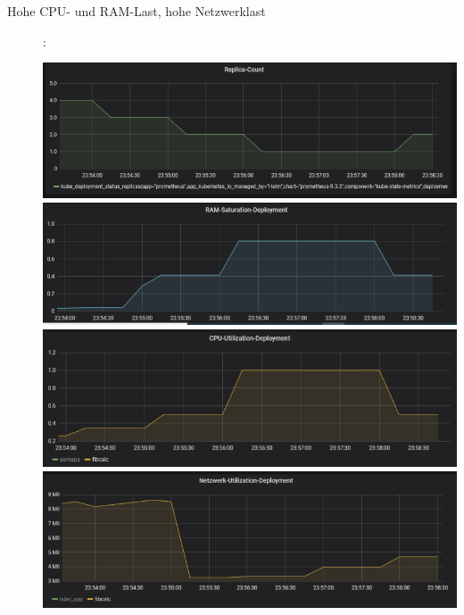 \documentclass[a4paper,10pt]{scrartcl}
\begin{document}
\begin{description}
\pagebreak

\item[Hohe CPU- und RAM-Last, hohe Netzwerklast]:\\
\begin{minipage}{\linewidth}
            \includegraphics[width=.5\textwidth]{img/RAMCPUSkalierung/ReplicaCount.PNG}
            \includegraphics[scale=1,width=.5\textwidth,height=.14\textheight]{img/RAMCPUSkalierung/RAMSaturation.PNG}
  			\includegraphics[scale=1,width=.5\textwidth]{img/RAMCPUSkalierung/CPUUtilization.PNG}
  			\includegraphics[scale=1,width=.5\textwidth]{img/RAMCPUSkalierung/Netzwerk.PNG}
\end{minipage}


\end{description}
\end{document}

